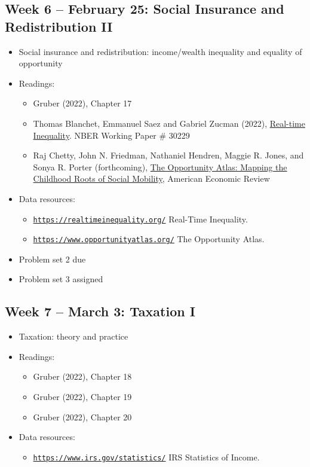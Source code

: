 \documentclass[11pt]{article}
\begin{document}
\subsection*{Week 6 -- February 25: Social Insurance and Redistribution II}
\begin{itemize}
    \setlength{\itemsep}{0em}
    \item Social insurance and redistribution: income/wealth inequality and equality of opportunity
    \item Readings:
    \begin{itemize}
        \item Gruber (2022), Chapter 17
        \item Thomas Blanchet, Emmanuel Saez and Gabriel Zucman (2022), \href{https://eml.berkeley.edu/~saez/BSZ2022.pdf}{Real-time Inequality}. NBER Working Paper \# 30229
        \item Raj Chetty, John N. Friedman, Nathaniel Hendren, Maggie R. Jones, and Sonya R. Porter (forthcoming), \href{https://opportunityinsights.org/paper/the-opportunity-atlas/}{The Opportunity Atlas: Mapping the Childhood Roots of Social Mobility}, American Economic Review
    \end{itemize}
    \item Data resources:
    \begin{itemize}
        \item \href{https://realtimeinequality.org/}{\nolinkurl{https://realtimeinequality.org/}} Real-Time Inequality.
        \item \href{https://www.opportunityatlas.org/}{\nolinkurl{https://www.opportunityatlas.org/}} The Opportunity Atlas.
    \end{itemize}
    \item Problem set 2 due
    \item Problem set 3 assigned
\end{itemize}

\subsection*{Week 7 -- March 3: Taxation I}
\begin{itemize}
    \setlength{\itemsep}{0em}
    \item Taxation: theory and practice
    \item Readings:
    \begin{itemize}
        \item Gruber (2022), Chapter 18
        \item Gruber (2022), Chapter 19
        \item Gruber (2022), Chapter 20
    \end{itemize}
    \item Data resources:
    \begin{itemize}
        \item \href{https://www.irs.gov/statistics/}{\nolinkurl{https://www.irs.gov/statistics/}} IRS Statistics of Income.
    \end{itemize}
\end{itemize}
\end{document}
